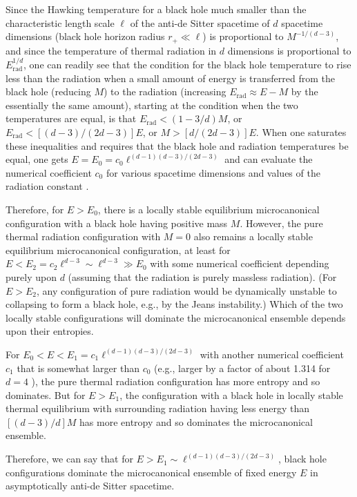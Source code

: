 \documentclass[12pt]{article} \usepackage{latexsym} \textwidth 15cm
\begin{document}
Since the Hawking temperature for a black hole much smaller than the
characteristic length scale $\ell$ of the anti-de Sitter spacetime of
$d$ spacetime dimensions (black hole horizon radius $r_+ \ll \ell$) is
proportional to $M^{-1/(d-3)}$, and since the temperature of thermal
radiation in $d$ dimensions is proportional to
$E_{\mathrm{rad}}^{1/d}$, one can readily see that the condition for
the black hole temperature to rise less than the radiation when a small
amount of energy is transferred from the black hole (reducing $M$) to
the radiation (increasing $E_{\mathrm{rad}} \approx E-M$ by the
essentially the same amount), starting at the condition when the two
temperatures are equal, is that $E_{\mathrm{rad}} < (1-3/d)M$, or
$E_{\mathrm{rad}} < [(d-3)/(2d-3)]E$, or $M > [d/(2d-3)]E$.  When one
saturates these inequalities and requires that the black hole and
radiation temperatures be equal, one gets $E = E_0 = c_0
\ell^{(d-1)(d-3)/(2d-3)}$ and can evaluate the numerical coefficient
$c_0$ for various spacetime dimensions and values of the radiation
constant \cite{Haw3,PagGRG,HawPage}.

Therefore, for $E > E_0$, there is a locally stable equilibrium
microcanonical configuration with a black hole having positive mass
$M$. However, the pure thermal radiation configuration with $M=0$ also
remains a locally stable equilibrium microcanonical configuration, at
least for $E < E_2 = c_2 \ell^{d-3} \sim \ell^{d-3} \gg E_0$ with some
numerical coefficient depending purely upon $d$ (assuming that the
radiation is purely massless radiation).  (For $E > E_2$, any
configuration of pure radiation would be dynamically unstable to
collapsing to form a black hole, e.g., by the Jeans instability.) 
Which of the two locally stable configurations will dominate the
microcanonical ensemble depends upon their entropies.

For $E_0 < E < E_1 = c_1 \ell^{(d-1)(d-3)/(2d-3)}$ with another
numerical coefficient $c_1$ that is somewhat larger than $c_0$ (e.g.,
larger by a factor of about 1.314 for $d=4$ \cite{HawPage}), the pure
thermal radiation configuration has more entropy and so dominates.  But
for $E > E_1$, the configuration with a black hole in locally stable
thermal equilibrium with surrounding radiation having less energy than
$[(d-3)/d]M$ has more entropy and so dominates the microcanonical
ensemble.

Therefore, we can say that for $E > E_1 \sim \ell^{(d-1)(d-3)/(2d-3)}$,
black hole configurations dominate the microcanonical ensemble of fixed
energy $E$ in asymptotically anti-de Sitter spacetime.
\end{document}
